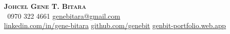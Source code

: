 \begin{center}
    \textbf{\Huge \scshape Johcel Gene T. Bitara} \\ \vspace{1pt}
     \ \small 0970 322 4661 \quad
    \href{mailto:genebitara@gmail.com}{ \underline{genebitara@gmail.com}} \\ \vspace{1pt}
    \href{https://www.linkedin.com/in/gene-bitara}{ \underline{linkedin.com/in/gene-bitara}} \quad
    \href{https://github.com/genebit}{ \underline{github.com/genebit}} \quad
    \href{http://genbit-portfolio.web.app}{ \underline{genbit-portfolio.web.app}} \quad
\end{center}